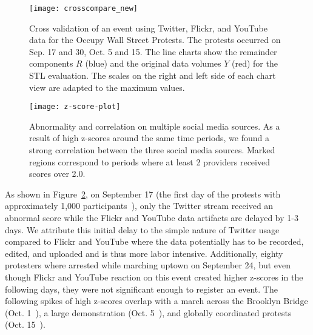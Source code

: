 \begin{figure}[tb]
\centering
\texttt{[image: crosscompare\_new]}
\caption{Cross validation of an event using Twitter, Flickr, and YouTube data for the Occupy Wall Street Protests.
	The protests occurred on Sep. 17 and 30, Oct. 5 and 15. The line charts show the remainder components $R$ (blue) and the original data volumes $Y$ (red) for the STL evaluation. The scales on the right and left side of each chart view are adapted to the maximum values.}
\label{fig:wallstreet}
\end{figure}


\begin{figure}[tb]
\centering
\texttt{[image: z-score-plot]}
\caption{Abnormality and correlation on multiple social media sources. 
As a result of high z-scores around the same time periods, we found a strong correlation 
between the three social media sources. Marked regions correspond to periods where at least 2 providers received scores over 2.0.}
\label{fig:plot}
\end{figure}



As shown in Figure~\ref{fig:plot}, on September 17 (the first day of the protests with approximately 1,000 participants~\cite{Sept17}),
only the Twitter stream received an abnormal score while the Flickr and YouTube data artifacts are delayed by 1-3 days.
We attribute this initial delay to the simple nature of Twitter usage compared to Flickr and YouTube where the data potentially has to be recorded, edited, and uploaded and is thus more labor intensive.
Additionally, eighty protesters where arrested while marching uptown on September 24, but even though Flickr and YouTube reaction on this event created higher z-scores in the following days, they were not significant enough to register an event.
The following spikes of high z-scores overlap with a march across the Brooklyn Bridge (Oct. 1~\cite{Oct01}), a large demonstration (Oct. 5~\cite{Oct05}), and globally coordinated protests (Oct. 15~\cite{Oct15}).


